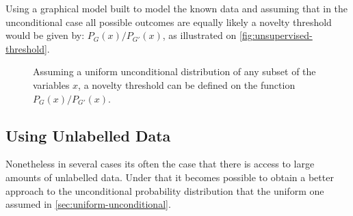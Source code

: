 \documentclass[runningheads,a4paper]{llncs}
\begin{document}
Using a graphical model built to model the known data and assuming that in the unconditional case all possible outcomes
are equally likely a novelty threshold would be given by: $P_G(x)/P_{G'}(x)$, as illustrated on \autoref{fig:unsupervised-threshold}.

\begin{figure}[h]
\centering
{}
\hfill
{}

\caption{\label{fig:unsupervised-threshold}
         Assuming a uniform unconditional distribution of any subset of the variables $x$,
         a novelty threshold can be defined on the function $P_G(x)/P_{G'}(x)$.}
\end{figure}


\subsection{Using Unlabelled Data}
Nonetheless in several cases its often the case that there is access to large amounts of unlabelled data.
Under that it becomes possible to obtain a better approach to the unconditional probability distribution that
the uniform one assumed in \autoref{sec:uniform-unconditional}.
\end{document}
